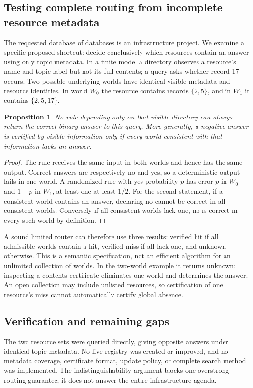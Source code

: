 \documentclass[11pt]{article}
\newtheorem{proposition}{Proposition}
\begin{document}
\subsection{Testing complete routing from incomplete resource metadata}
The requested database of databases is an infrastructure project. We examine a specific proposed shortcut: decide conclusively which resources contain an answer using only topic metadata. In a finite model a directory observes a resource's name and topic label but not its full contents; a query asks whether record 17 occurs. Two possible underlying worlds have identical visible metadata and resource identities. In world $W_0$ the resource contains records $\{2,5\}$, and in $W_1$ it contains $\{2,5,17\}$.
\begin{proposition}
No rule depending only on that visible directory can always return the correct binary answer to this query. More generally, a negative answer is certified by visible information only if every world consistent with that information lacks an answer.
\end{proposition}
\begin{proof}
The rule receives the same input in both worlds and hence has the same output. Correct answers are respectively no and yes, so a deterministic output fails in one world. A randomized rule with yes-probability $p$ has error $p$ in $W_0$ and $1-p$ in $W_1$, at least one at least $1/2$. For the second statement, if a consistent world contains an answer, declaring no cannot be correct in all consistent worlds. Conversely if all consistent worlds lack one, no is correct in every such world by definition.
\end{proof}
A sound limited router can therefore use three results: verified hit if all admissible worlds contain a hit, verified miss if all lack one, and unknown otherwise. This is a semantic specification, not an efficient algorithm for an unlimited collection of worlds. In the two-world example it returns unknown; inspecting a contents certificate eliminates one world and determines the answer. An open collection may include unlisted resources, so certification of one resource's miss cannot automatically certify global absence.
\subsection{Verification and remaining gaps}
The two resource sets were queried directly, giving opposite answers under identical topic metadata. No live registry was created or improved, and no metadata coverage, certificate format, update policy, or complete search method was implemented. The indistinguishability argument blocks one overstrong routing guarantee; it does not answer the entire infrastructure agenda.
\end{document}

